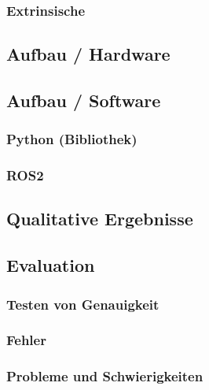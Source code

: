 		\subsubsection{Extrinsische}
			\label{chap:kalibrierung_extrinsisch}
		
	\subsection{Aufbau / Hardware}
		\label{chap:aufbau_hardware}
	
	\subsection{Aufbau / Software}
		\subsubsection{Python (Bibliothek)}
		\subsubsection{ROS2}
		
	\subsection{Qualitative Ergebnisse}
	
	\subsection{Evaluation}
		\subsubsection{Testen von Genauigkeit}
		\subsubsection{Fehler}
		\subsubsection{Probleme und Schwierigkeiten}
			\label{chap:probleme_schwierigkeiten}